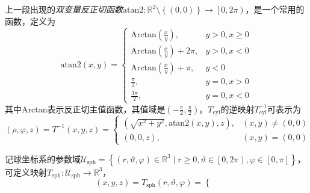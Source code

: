 \documentclass[../main.tex]{subfiles}
\begin{document}
\begin{example}[柱坐标系与球坐标系的参数域映射]
    上一段出现的\emph{双变量反正切函数}$\mathrm{atan2}:\mathbb{R}^2\setminus\left\{(0,0)\right\}\rightarrow\left[0,2\pi\right)$，是一个常用的函数，定义为
    \[\mathrm{atan2}\left(x,y\right)=\left\{\begin{array}{ll}
            \mathrm{Arctan}\left(\frac{x}{y}\right),      & y>0,x\geq 0 \\
            \mathrm{Arctan}\left(\frac{x}{y}\right)+2\pi, & y>0,x<0     \\
            \mathrm{Arctan}\left(\frac{x}{y}\right)+\pi,  & y<0         \\
            \frac{\pi}{2},                                & y=0,x>0     \\
            \frac{3\pi}{2},                               & y=0,x<0
        \end{array}\right.
    \]
    其中$\mathrm{Arctan}$表示反正切主值函数，其值域是$\left(-\frac{\pi}{2},\frac{\pi}{2}\right)$。$T_\mathrm{cyl}$的逆映射$T_\mathrm{cyl}^{-1}$可表示为
    \[\left(\rho,\varphi,z\right)=T^{-1}\left(x,y,z\right)=\left\{\begin{array}{ll}
            \left(\sqrt{x^2+y^2},\mathrm{atan2}\left(x,y\right),z\right), & \left(x,y\right)\neq\left(0,0\right) \\
            \left(0,0,z\right),                                           & \left(x,y\right)=\left(0,0\right)
        \end{array}\right.
    \]

    记球坐标系的参数域$\mathcal{U}_\mathrm{sph}=\left\{\left(r,\vartheta,\varphi\right)\in\mathbb{R}^3 \mid r\geq 0,\vartheta\in\left[0,2\pi\right),\varphi\in\left[0,\pi\right]\right\}$，可定义映射$T_\mathrm{sph}:\mathcal{U}_\mathrm{sph}\rightarrow\mathbb{R}^3$，
    \[
        \left(x,y,z\right)=T_\mathrm{sph}\left(r,\vartheta,\varphi\right)=\left\{\begin{array}{ll}


\end{array}\]
\end{example}
\end{document}
